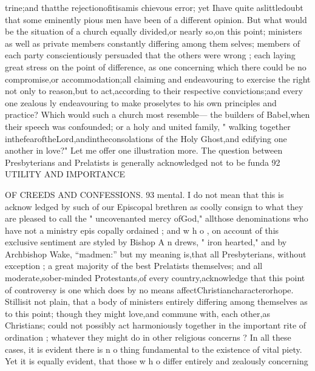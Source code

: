 \documentclass[
]{book}
\begin{document}
trine;and thatthe rejectionofitisamis
chievous error; yet Ihave quite aslittledoubt that some eminently pious men have been of a different opinion. But what would be the situation of a church equally divided,or nearly
so,on this point; ministers as well as private members constantly differing among them
selves; members of each party conscientiously persuaded that the others were wrong ; each laying great stress on the point of difference, as one concerning which there could be no
compromise,or accommodation;all claiming and endeavouring to exercise the right not only to reason,but to act,according to their respective convictions;and every one zealous ly endeavouring to make proselytes to his own principles and practice? Which would such a church most resemble--- the builders of Babel,when their speech was confounded; or a holy and united family, " walking together inthefearoftheLord,andintheconsolations
of the Holy Ghost,and edifying one another in love?"
Let me offer one illustration more. The question between Presbyterians and Prelatists is generally acknowledged not to be funda
92 UTILITY AND IMPORTANCE

OF CREEDS AND CONFESSIONS. 93
mental. I do not mean that this is acknow
ledged by such of our Episcopal brethren as
coolly consign to what they are pleased to call
the " uncovenanted mercy ofGod," allthose denominations who have not a ministry epis
copally ordained ; and w h o , on account of this
exclusive sentiment are styled by Bishop A n
drews, " iron hearted," and by Archbishop
Wake, ``madmen:'' but my meaning is,that
all Presbyterians, without exception ; a great
majority of the best Prelatists themselves;
and all moderate,sober-minded Protestants,of
every country,acknowledge that this point of
controversy is one which does by no means affectChristiancharacterorhope. Stillisit
not plain, that a body of ministers entirely differing among themselves as to this point; though they might love,and commune with, each other,as Christians; could not possibly act harmoniously together in the important rite of ordination ; whatever they might do in other religious concerns ?
In all these cases, it is evident there is n o
thing fundamental to the existence of vital
piety. Yet it is equally evident, that those w h o differ entirely and zealously concerning
\end{document}
